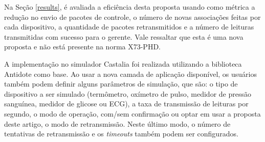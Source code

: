 Na Seção \ref{results}, é avaliada a eficiência desta proposta usando como métrica a redução no envio de pacotes de controle, o número de novas associações feitas por cada dispositivo, a quantidade de pacotes retransmitidos e a número de leituras transmitidas com sucesso para o gerente. Vale ressaltar que esta é uma nova proposta e não está presente na norma X73-PHD.

A implementação no simulador Castalia foi realizada utilizando a biblioteca Antidote \cite{b20} como base. Ao usar a nova camada de aplicação disponível, os usuários também podem definir alguns parâmetros de simulação, que são: o tipo de dispositivo a ser simulado (termômetro, oxímetro de pulso, medidor de pressão sanguínea, medidor de glicose ou ECG), a taxa de transmissão de leituras por segundo, o modo de operação, com/sem confirmação ou optar em usar a proposta deste artigo, o modo de retransmissão.  Neste último modo, o número de tentativas de retransmissão e os \textit{timeouts} também podem ser configurados.
